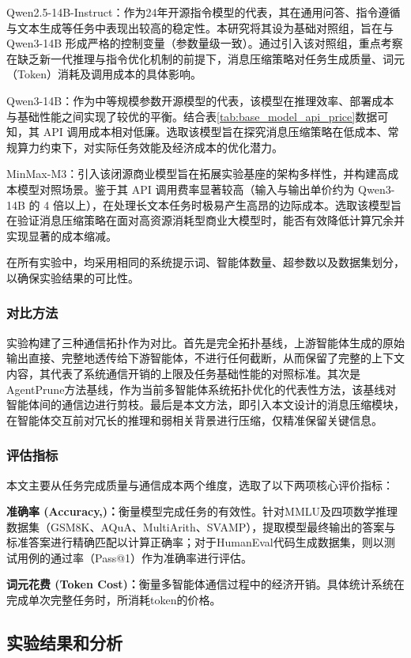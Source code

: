 Qwen2.5-14B-Instruct：作为24年开源指令模型的代表，其在通用问答、指令遵循与文本生成等任务中表现出较高的稳定性。本研究将其设为基础对照组，旨在与 Qwen3-14B 形成严格的控制变量（参数量级一致）。通过引入该对照组，重点考察在缺乏新一代推理与指令优化机制的前提下，消息压缩策略对任务生成质量、词元（Token）消耗及调用成本的具体影响。

Qwen3-14B：作为中等规模参数开源模型的代表，该模型在推理效率、部署成本与基础性能之间实现了较优的平衡。结合表\ref{tab:base_model_api_price}数据可知，其 API 调用成本相对低廉。选取该模型旨在探究消息压缩策略在低成本、常规算力约束下，对实际任务效能及经济成本的优化潜力。

MinMax-M3：引入该闭源商业模型旨在拓展实验基座的架构多样性，并构建高成本模型对照场景。鉴于其 API 调用费率显著较高（输入与输出单价约为 Qwen3-14B 的 4 倍以上），在处理长文本任务时极易产生高昂的边际成本。选取该模型旨在验证消息压缩策略在面对高资源消耗型商业大模型时，能否有效降低计算冗余并实现显著的成本缩减。

在所有实验中，均采用相同的系统提示词、智能体数量、超参数以及数据集划分，以确保实验结果的可比性。


\subsubsection{对比方法}实验构建了三种通信拓扑作为对比。首先是完全拓扑基线，上游智能体生成的原始输出直接、完整地透传给下游智能体，不进行任何截断，从而保留了完整的上下文内容，其代表了系统通信开销的上限及任务基础性能的对照标准。其次是AgentPrune方法基线，作为当前多智能体系统拓扑优化的代表性方法，该基线对智能体间的通信边进行剪枝。最后是本文方法，即引入本文设计的消息压缩模块，在智能体交互前对冗长的推理和弱相关背景进行压缩，仅精准保留关键信息。

\subsubsection{评估指标}本文主要从任务完成质量与通信成本两个维度，选取了以下两项核心评价指标：
\par \textbf{准确率 (Accuracy,)：}衡量模型完成任务的有效性。针对MMLU及四项数学推理数据集（GSM8K、AQuA、MultiArith、SVAMP），提取模型最终输出的答案与标准答案进行精确匹配以计算正确率；对于HumanEval代码生成数据集，则以测试用例的通过率（Pass@1）作为准确率进行评估。
\par \textbf{词元花费 (Token Cost)：}衡量多智能体通信过程中的经济开销。具体统计系统在完成单次完整任务时，所消耗token的价格。


\subsection{实验结果和分析}

